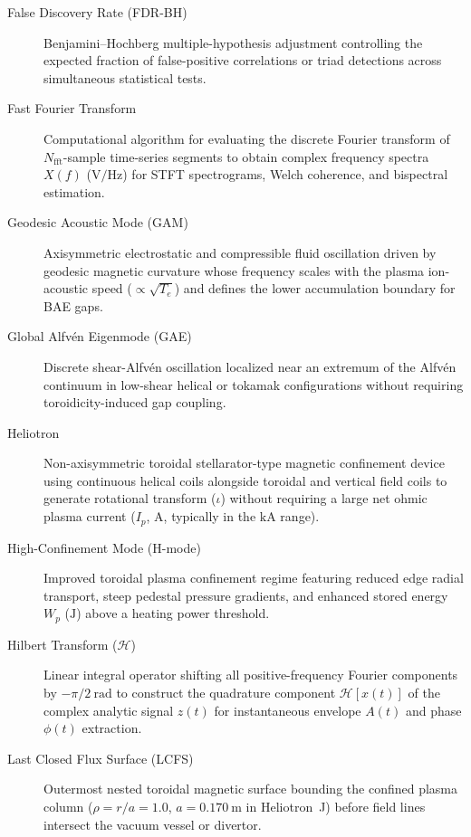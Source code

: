 \begin{description}
\item[False Discovery Rate (FDR-BH)] Benjamini--Hochberg multiple-hypothesis adjustment controlling the expected fraction of false-positive correlations or triad detections across simultaneous statistical tests.

\item[Fast Fourier Transform] Computational algorithm for evaluating the discrete Fourier transform of $N_{\mathrm{fft}}$-sample time-series segments to obtain complex frequency spectra $X(f)$ ($\mathrm{V/Hz}$) for STFT spectrograms, Welch coherence, and bispectral estimation.

\item[Geodesic Acoustic Mode (GAM)] Axisymmetric electrostatic and compressible fluid oscillation driven by geodesic magnetic curvature whose frequency scales with the plasma ion-acoustic speed ($\propto \sqrt{T_e}$) and defines the lower accumulation boundary for BAE gaps.

\item[Global Alfv\'{e}n Eigenmode (GAE)] Discrete shear-Alfv\'{e}n oscillation localized near an extremum of the Alfv\'{e}n continuum in low-shear helical or tokamak configurations without requiring toroidicity-induced gap coupling.

\item[Heliotron] Non-axisymmetric toroidal stellarator-type magnetic confinement device using continuous helical coils alongside toroidal and vertical field coils to generate rotational transform ($\iota$) without requiring a large net ohmic plasma current ($I_p$, $\mathrm{A}$, typically in the $\mathrm{kA}$ range).

\item[High-Confinement Mode (H-mode)] Improved toroidal plasma confinement regime featuring reduced edge radial transport, steep pedestal pressure gradients, and enhanced stored energy $W_p$ ($\mathrm{J}$) above a heating power threshold.

\item[Hilbert Transform ($\mathcal{H}$)] Linear integral operator shifting all positive-frequency Fourier components by $-\pi/2~\mathrm{rad}$ to construct the quadrature component $\mathcal{H}[x(t)]$ of the complex analytic signal $z(t)$ for instantaneous envelope $A(t)$ and phase $\phi(t)$ extraction.

\item[Last Closed Flux Surface (LCFS)] Outermost nested toroidal magnetic surface bounding the confined plasma column ($\rho = r/a = 1.0$, $a = 0.170~\mathrm{m}$ in Heliotron~J) before field lines intersect the vacuum vessel or divertor.


\end{description}
